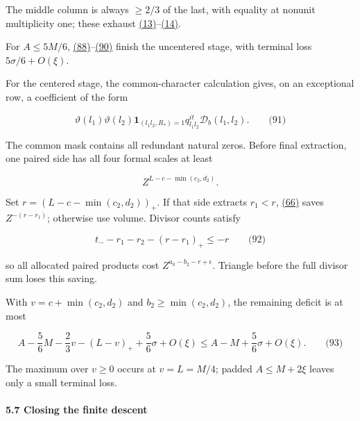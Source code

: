 The middle column is always \(\ge2/3\) of the last, with equality at nonunit multiplicity one; these exhaust \protect\hyperlink{cf:eq:A.17}{(13)}--\protect\hyperlink{cf:eq:A.18}{(14)}.

For \(A\le5M/6\), \protect\hyperlink{cf:eq:D.24}{(88)}--\protect\hyperlink{cf:eq:D.26}{(90)} finish the uncentered stage, with terminal loss \(5\sigma/6+O(\xi)\).

For the centered stage, the common-character calculation gives, on an exceptional row, a coefficient of the form

\hypertarget{cf:eq:D.27}{}

\label{cf:eq:D.27}

\[
\vartheta(l_1)\vartheta(l_2)\mathbf1_{(l_1l_2,R_*)=1}q_{l_1l_2}^{it}\mathcal D_b(l_1,l_2).
\qquad\text{(91)}
\]

The common mask contains all redundant natural zeros. Before final extraction, one paired side has all four formal scales at least

\[
Z^{L-c-\min(c_2,d_2)}.
\]

Set \(r=(L-c-\min(c_2,d_2))_+\). If that side extracts \(r_1<r\), \protect\hyperlink{cf:eq:D.2}{(66)} saves \(Z^{-(r-r_1)}\); otherwise use volume. Divisor counts satisfy

\hypertarget{cf:eq:D.28}{}

\label{cf:eq:D.28}

\[
t_--r_1-r_2-(r-r_1)_+\le-r
\qquad\text{(92)}
\]

so all allocated paired products cost \(Z^{a_0-b_2-r+\epsilon}\). Triangle before the full divisor sum loses this saving.

With \(v=c+\min(c_2,d_2)\) and \(b_2\ge\min(c_2,d_2)\), the remaining deficit is at most

\hypertarget{cf:eq:D.29}{}

\label{cf:eq:D.29}

\[
A-\frac56M-\frac23v-(L-v)_++\frac56\sigma+O(\xi)
\le A-M+\frac56\sigma+O(\xi).
\qquad\text{(93)}
\]

The maximum over \(v\ge0\) occurs at \(v=L=M/4\); padded \(A\le M+2\xi\) leaves only a small terminal loss.

\hypertarget{cf:sec:D.7}{}

\label{cf:sec:D.7}

\hypertarget{closing-the-finite-descent}{%
\paragraph{5.7 Closing the finite descent}\label{closing-the-finite-descent}}

